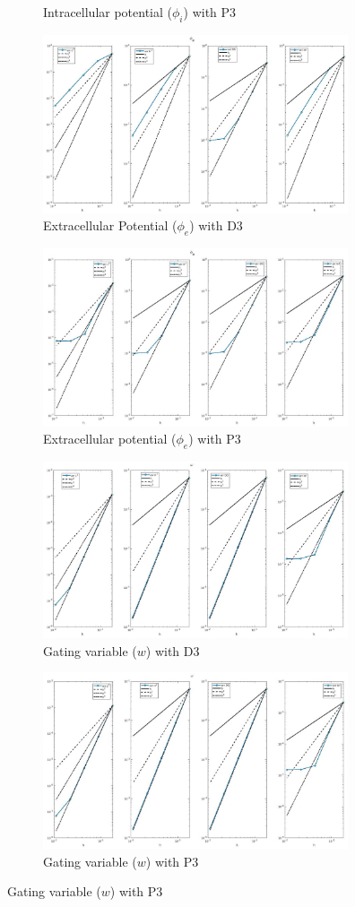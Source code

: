 \documentclass[a4paper,11pt]{article}
\begin{document}
\begin{figure}[h]
\begin{subfigure}{0.5\textwidth}
\caption{Intracellular potential ($\phi_i$) with P3}
\end{subfigure}
\begin{subfigure}{0.5\textwidth}
\includegraphics[width = 9cm]{./D3_Phie_1.jpg}
\caption{Extracellular Potential ($\phi_e$) with D3}
\end{subfigure}
\begin{subfigure}{0.5\textwidth}
\includegraphics[width =9cm]{./P3_Phie_1.jpg}
\caption{Extracellular potential ($\phi_e$) with P3}
\label{Phie_P3}
\end{subfigure}
\begin{subfigure}{0.5\textwidth}
\includegraphics[width = 9cm]{./D3_w_1.jpg}
\caption{Gating variable ($w$) with D3}
\label{w_D3}
\end{subfigure}
\begin{subfigure}{0.5\textwidth}
\includegraphics[width =9cm]{./P3_w_1.jpg}
\caption{Gating variable ($w$) with P3}
\label{w_P3}
\end{subfigure}
\end{figure}
\restoregeometry
\newpage
\end{document}
